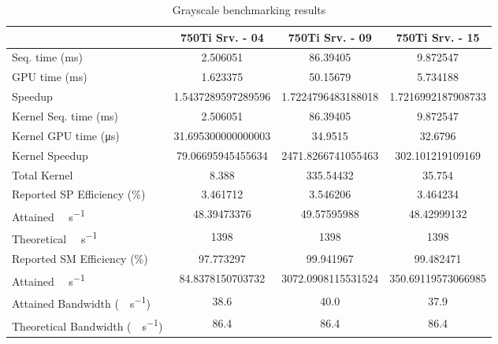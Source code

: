 \begin{table}[H]
	\centering
	\caption{Grayscale benchmarking results}
	\label{tab:grayscale-results}
	\begin{tabular}{lS[table-format=7.1]S[table-format=7.1]S[table-format=7.1]}
		\toprule
			~ & {\textbf{750Ti Srv. - 04}} & {\textbf{750Ti Srv. - 09}} & {\textbf{750Ti Srv. - 15}} \\
		\midrule
			{Seq. time (\si{\milli\second})} & 2.506051 & 86.39405 & 9.872547 \\
			{GPU time (\si{\milli\second})} & 1.623375 & 50.15679 & 5.734188 \\
			{Speedup} & 1.5437289597289596 &1.7224796483188018 & 1.7216992187908733 \\
		\midrule
			{Kernel Seq. time (\si{\milli\second})} & 2.506051 & 86.39405 & 9.872547 \\
			{Kernel GPU time (\si{\micro\second})} & 31.695300000000003 & 34.9515 & 32.6796 \\
			{Kernel Speedup} & 79.06695945455634 & 2471.8266741055463 & 302.101219109169 \\
		\midrule
			{Total Kernel \si{\mega\flops}} & 8.388 & 335.54432 & 35.754 \\
			{Reported SP Efficiency (\si{\percent})} & 3.461712 & 3.546206 & 3.464234 \\
			{Attained \si{\giga\flops\per\second}} & 48.39473376 & 49.57595988 & 48.42999132 \\
			{Theoretical \si{\giga\flops\per\second}} & 1398 & 1398 & 1398 \\
		\midrule
			{Reported SM Efficiency (\si{\percent})} & 97.773297 & 99.941967 & 99.482471 \\
			{Attained \si{\giga\iops\per\second}} & 84.8378150703732 & 3072.0908115531524 & 350.69119573066985 \\			
		\midrule
			{Attained Bandwidth (\si{\giga\byte\per\second})} & 38.6 & 40.0  & 37.9 \\
			{Theoretical Bandwidth (\si{\giga\byte\per\second})}	& 86.4 & 86.4 & 86.4 \\
		\bottomrule
	\end{tabular}
\end{table}